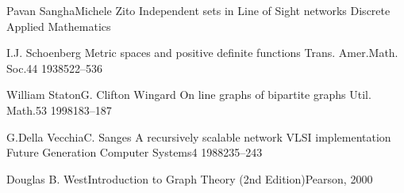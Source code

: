 \documentclass[12pt,a4paper,titlepage,openany]{report}
\begin{document}
\begin{thebibliography}{99}
  \articleInJournalTwoAuthorsInPrint
    {Pavan Sangha}{Michele Zito}
    {Independent sets in Line of Sight networks}
   {Discrete Applied Mathematics}

\articleInJournalOneAuthor
    {I.J. Schoenberg}
    {Metric spaces and positive definite functions}
   {Trans. Amer.Math. Soc.}{44}
   {1938}{522--536}


  \articleInJournalManyAuthors
    {William Staton}{G. Clifton Wingard}
    {On line graphs of bipartite graphs}
   {Util. Math.}{53}
   {1998}{183--187}

  \articleInJournalManyAuthors
    {G.Della Vecchia}{C. Sanges}
    {A recursively scalable network VLSI implementation}
   {Future Generation Computer Systems}{4}
   {1988}{235--243}

\bookOneAuthor
{Douglas B. West}{Introduction to Graph Theory (2nd Edition)}{Pearson, 2000}

\end{thebibliography}
%
%
%
%
%
%
%
%
%
\end{document}
